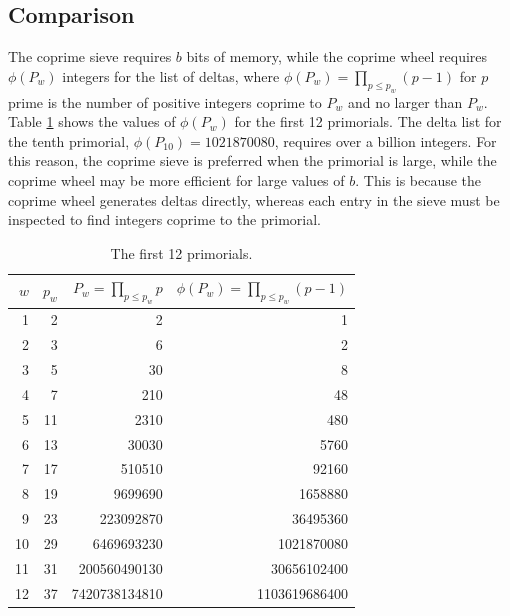 \documentclass{ucalgthes1}
\theoremstyle{definition}
\begin{document}
\subsection{Comparison}

The coprime sieve requires $b$ bits of memory, while the coprime wheel requires $\phi(P_w)$ integers for the list of deltas, where $\phi(P_w) = \prod_{p \le p_w}(p-1)$ for $p$ prime is the number of positive integers coprime to $P_w$ and no larger than $P_w$.  Table \ref{tab:primorialRateOfGrowth} shows the values of $\phi(P_w)$ for the first 12 primorials.  The delta list for the tenth primorial, $\phi(P_{10}) = 1021870080$, requires over a billion integers.  For this reason, the coprime sieve is preferred when the primorial is large, while the coprime wheel may be more efficient for large values of $b$.  This is because the coprime wheel generates deltas directly, whereas each entry in the sieve must be inspected to find integers coprime to the primorial.

\begin{table}[htb]
\centering
\begin{tabular}{| r | r | r | r |}
	\hline
	$w$ & $p_w$ & $P_w = \prod_{p \le p_w} p$ & $\phi(P_w) = \prod_{p \le p_w} (p-1)$ \\
	\hline
1 & 2 & 2 & 1 \\
2 & 3 & 6 & 2 \\
3 & 5 & 30 & 8 \\
4 & 7 & 210 & 48 \\
5 & 11 & 2310 & 480 \\
6 & 13 & 30030 & 5760 \\
7 & 17 & 510510 & 92160 \\
8 & 19 & 9699690 & 1658880 \\
9 & 23 & 223092870 & 36495360 \\
10 & 29 & 6469693230 & 1021870080 \\
11 & 31 & 200560490130 & 30656102400 \\
12 & 37 & 7420738134810 & 1103619686400 \\
	\hline
\end{tabular}
\caption{The first 12 primorials.}
\label{tab:primorialRateOfGrowth}
\end{table}
\end{document}
